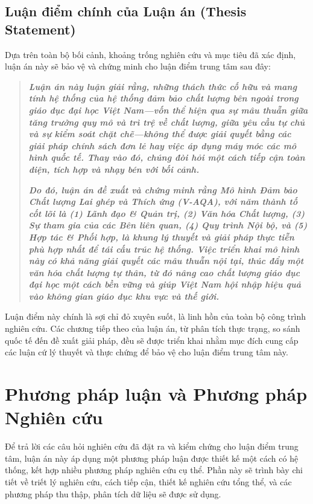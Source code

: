 \documentclass[12pt, a4paper, openany]{report}
\begin{document}
\subsection{Luận điểm chính của Luận án (Thesis Statement)}
\label{subsec:luan_diem_chinh}

Dựa trên toàn bộ bối cảnh, khoảng trống nghiên cứu và mục tiêu đã xác định, luận án này sẽ bảo vệ và chứng minh cho luận điểm trung tâm sau đây:

\begin{quote}
\textit{\textbf{
Luận án này luận giải rằng, những thách thức cố hữu và mang tính hệ thống của hệ thống đảm bảo chất lượng bên ngoài trong giáo dục đại học Việt Nam—vốn thể hiện qua sự mâu thuẫn giữa tăng trưởng quy mô và trì trệ về chất lượng, giữa yêu cầu tự chủ và sự kiểm soát chặt chẽ—không thể được giải quyết bằng các giải pháp chính sách đơn lẻ hay việc áp dụng máy móc các mô hình quốc tế. Thay vào đó, chúng đòi hỏi một cách tiếp cận toàn diện, tích hợp và nhạy bén với bối cảnh.
}}

\textit{\textbf{
Do đó, luận án đề xuất và chứng minh rằng Mô hình Đảm bảo Chất lượng Lai ghép và Thích ứng (V-AQA), với năm thành tố cốt lõi là (1) Lãnh đạo \& Quản trị, (2) Văn hóa Chất lượng, (3) Sự tham gia của các Bên liên quan, (4) Quy trình Nội bộ, và (5) Hợp tác \& Phối hợp, là khung lý thuyết và giải pháp thực tiễn phù hợp nhất để tái cấu trúc hệ thống. Việc triển khai mô hình này có khả năng giải quyết các mâu thuẫn nội tại, thúc đẩy một văn hóa chất lượng tự thân, từ đó nâng cao chất lượng giáo dục đại học một cách bền vững và giúp Việt Nam hội nhập hiệu quả vào không gian giáo dục khu vực và thế giới.
}}
\end{quote}

Luận điểm này chính là sợi chỉ đỏ xuyên suốt, là linh hồn của toàn bộ công trình nghiên cứu. Các chương tiếp theo của luận án, từ phân tích thực trạng, so sánh quốc tế đến đề xuất giải pháp, đều sẽ được triển khai nhằm mục đích cung cấp các luận cứ lý thuyết và thực chứng để bảo vệ cho luận điểm trung tâm này.


\section{Phương pháp luận và Phương pháp Nghiên cứu}
\label{sec:phuong_phap_luan}

Để trả lời các câu hỏi nghiên cứu đã đặt ra và kiểm chứng cho luận điểm trung tâm, luận án này áp dụng một phương pháp luận được thiết kế một cách có hệ thống, kết hợp nhiều phương pháp nghiên cứu cụ thể. Phần này sẽ trình bày chi tiết về triết lý nghiên cứu, cách tiếp cận, thiết kế nghiên cứu tổng thể, và các phương pháp thu thập, phân tích dữ liệu sẽ được sử dụng.
\end{document}

